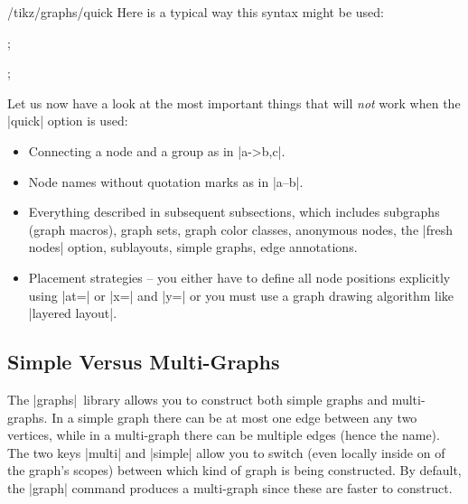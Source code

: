 \begin{key}{/tikz/graphs/quick}
    Here is a typical way this syntax might be used:
\begin{codeexample}[preamble={\usetikzlibrary{graphs,quotes}}]
\tikz {};
\end{codeexample}

\begin{codeexample}[preamble={\usetikzlibrary{graphs}}]
\tikz {};
\end{codeexample}

    Let us now have a look at the most important things that will \emph{not}
    work when the |quick| option is used:

    \begin{itemize}
        \item Connecting a node and a group as in |a->{b,c}|.
        \item Node names without quotation marks as in |a--b|.
        \item Everything described in subsequent subsections, which includes
            subgraphs (graph macros), graph sets, graph color classes,
            anonymous nodes, the |fresh nodes| option, sublayouts, simple
            graphs, edge annotations.
        \item Placement strategies -- you either have to define all node
            positions explicitly using |at=| or |x=| and |y=| or you must use a
            graph drawing algorithm like |layered layout|.
    \end{itemize}
\end{key}


\subsection{Simple Versus Multi-Graphs}
\label{section-library-graphs-simple}

The |graphs| library allows you to construct both simple graphs and
multi-graphs. In a simple graph there can be at most one edge between any two
vertices, while in a multi-graph there can be multiple edges (hence the name).
The two keys |multi| and |simple| allow you to switch (even locally inside on
of the graph's scopes) between which kind of graph is being constructed. By
default, the |graph| command produces a multi-graph since these are faster to
construct.

